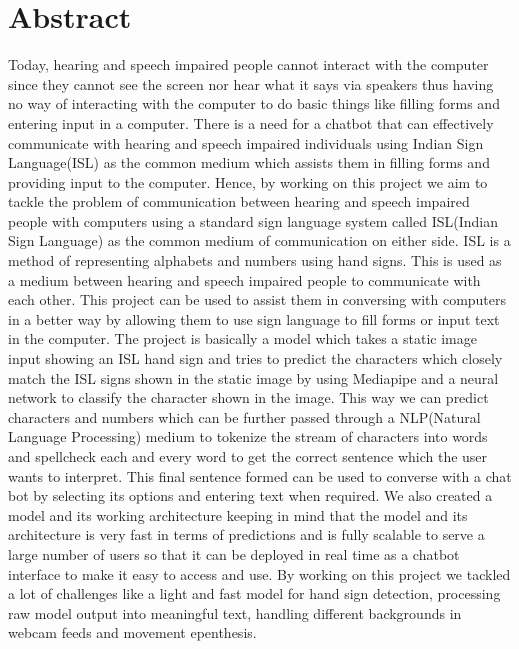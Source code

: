 \documentclass[12pt,a4paper]{report}
\begin{document}
\renewcommand\bibname{References}

\chapter*{Abstract}
Today, hearing and speech impaired people cannot interact with the computer since they cannot see the screen nor hear what it says via speakers thus having no way of interacting with the computer to do basic things like filling forms and entering input in a computer. There is a need for a chatbot that can effectively communicate with hearing and speech impaired individuals using Indian Sign Language(ISL) as the common medium which assists them in filling forms and providing input to the computer. Hence, by working on this project we aim to tackle the problem of communication between hearing and speech impaired people with computers using a standard sign language system called ISL(Indian Sign Language) as the common medium of communication on either side. ISL is a method of representing alphabets and numbers using hand signs. This is used as a medium between hearing and speech impaired people to communicate with each other. This project can be used to assist them in conversing with computers in a better way by allowing them to use sign language to fill forms or input text in the computer. The project is basically a model which takes a static image input showing an ISL hand sign and tries to predict the characters which closely match the ISL signs shown in the static image by using Mediapipe and a neural network to classify the character shown in the image. This way we can predict characters and numbers which can be further passed through a NLP(Natural Language Processing) medium to tokenize the stream of characters into words and spellcheck each and every word to get the correct sentence which the user wants to interpret. This final sentence formed can be used to converse with a chat bot by selecting its options and entering text when required. We also created a model and its working architecture keeping in mind that the model and its architecture is very fast in terms of predictions and is fully scalable to serve a large number of users so that it can be deployed in real time as a chatbot interface to make it easy to access and use. By working on this project we tackled a lot of challenges like a light and fast model for hand sign detection, processing raw model output into meaningful text, handling different backgrounds in webcam feeds and movement epenthesis. 

\tableofcontents
\listoffigures
\listoftables
\end{document}
